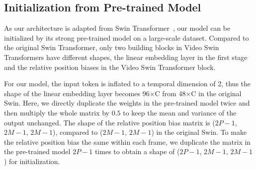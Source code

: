 \documentclass{article}
\begin{document}
\subsection{Initialization from Pre-trained Model}

As our architecture is adapted from Swin Transformer~\cite{liu2021swin}, our model can be initialized by its strong pre-trained model on a large-scale dataset.
Compared to the original Swin Transformer, only two building blocks in Video Swin Transformers have different shapes, the linear embedding layer in the first stage and the relative position biases in the Video Swin Transformer block.

For our model, the input token is inflated to a temporal dimension of 2, thus the shape of the linear embedding layer becomes 96$\times$C from 48$\times$C in the original Swin. Here, we directly duplicate the weights in the pre-trained model twice and then multiply the whole matrix by $0.5$ to keep the mean and variance of the output unchanged.
The shape of the relative position bias matrix is ($2P-1$, $2M-1$, $2M-1$), compared to ($2M-1$, $2M-1$) in the original Swin. To make the relative position bias the same within each frame, we duplicate the matrix in the pre-trained model $2P-1$ times to obtain a shape of ($2P-1$, $2M-1$, $2M-1$) for initialization. 
\end{document}
